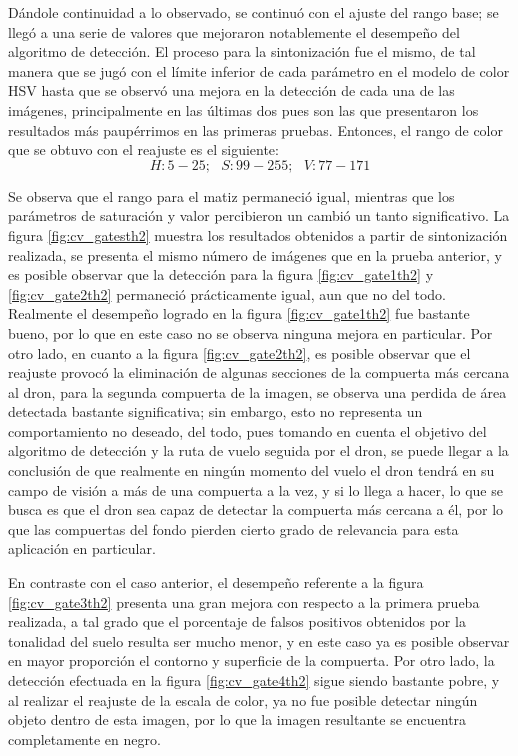Dándole continuidad a lo observado, se continuó con el ajuste del rango base; se llegó a una serie de valores que mejoraron notablemente el desempeño del algoritmo de detección. El proceso para la sintonización fue el mismo, de tal manera que se jugó con el límite inferior de cada parámetro en el modelo de color HSV hasta que se observó una mejora en la detección de cada una de las imágenes, principalmente en las últimas dos pues son las que presentaron los resultados más paupérrimos en las primeras pruebas. Entonces, el rango de color que se obtuvo con el reajuste es el siguiente: \[H:5-25;\text{ } S:99-255;\text{ } V:77-171\]

Se observa que el rango para el matiz permaneció igual, mientras que los parámetros de saturación y valor percibieron un cambió un tanto significativo. La figura \ref{fig:cv_gatesth2} muestra los resultados obtenidos a partir de sintonización realizada, se presenta el mismo número de imágenes que en la prueba anterior, y es posible observar que la detección para la figura \ref{fig:cv_gate1th2} y \ref{fig:cv_gate2th2} permaneció prácticamente igual, aun que no del todo. Realmente el desempeño logrado en la figura \ref{fig:cv_gate1th2} fue bastante bueno, por lo que en este caso no se observa ninguna mejora en particular. Por otro lado, en cuanto a la figura \ref{fig:cv_gate2th2}, es posible observar que el reajuste provocó la eliminación de algunas secciones de la compuerta más cercana al dron, para la segunda compuerta de la imagen, se observa una perdida de área detectada bastante significativa; sin embargo, esto no representa un comportamiento no deseado, del todo, pues tomando en cuenta el objetivo del algoritmo de detección y la ruta de vuelo seguida por el dron, se puede llegar a la conclusión de que realmente en ningún momento del vuelo el dron tendrá en su campo de visión a más de una compuerta a la vez, y si lo llega a hacer, lo que se busca es que el dron sea capaz de detectar la compuerta más cercana a él, por lo que las compuertas del fondo pierden cierto grado de relevancia para esta aplicación en particular. 

En contraste con el caso anterior, el desempeño referente a la figura \ref{fig:cv_gate3th2} presenta una gran mejora con respecto a la primera prueba realizada, a tal grado que el porcentaje de falsos positivos obtenidos por la tonalidad del suelo resulta ser mucho menor, y en este caso ya es posible observar en mayor proporción el contorno y superficie de la compuerta. Por otro lado, la detección efectuada en la figura \ref{fig:cv_gate4th2} sigue siendo bastante pobre, y al realizar el reajuste de la escala de color, ya no fue posible detectar ningún objeto dentro de esta imagen, por lo que la imagen resultante se encuentra completamente en negro.


